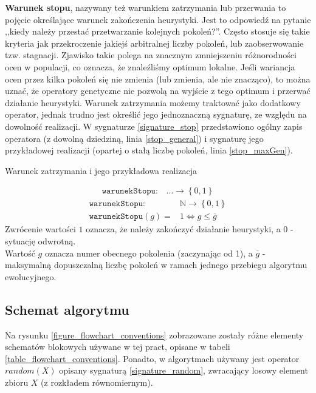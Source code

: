 \documentclass[twoside]{iisthesis}
\newcommand{\numberSet}{\mathbb}
\newcommand{\param}{\mathtt}
\begin{document}
\textbf{Warunek stopu}, nazywany też warunkiem zatrzymania lub przerwania to pojęcie określające warunek zakończenia heurystyki. Jest to odpowiedź na pytanie ,,kiedy należy przestać przetwarzanie kolejnych pokoleń?''. Często stosuje się takie kryteria jak przekroczenie jakiejś arbitralnej liczby pokoleń, lub zaobserwowanie tzw. stagnacji. Zjawisko takie polega na znacznym zmniejszeniu różnorodności ocen w populacji, co oznacza, że znaleźliśmy optimum lokalne. Jeśli wariancja ocen przez kilka pokoleń się nie zmienia (lub zmienia, ale nie znacząco), to można uznać, że operatory genetyczne nie pozwolą na wyjście z tego optimum i przerwać działanie heurystyki. 
Warunek zatrzymania możemy traktować jako dodatkowy operator, jednak trudno jest określić jego jednoznaczną sygnaturę, ze względu na dowolność realizacji. W sygnaturze \ref{signature_stop} przedstawiono ogólny zapis operatora (z dowolną dziedziną, linia \ref{stop_general}) i sygnaturę jego przykładowej realizacji (opartej o stałą liczbę pokoleń, linia \ref{stop_maxGen}).

\begin{signature}
	\caption{Warunek zatrzymania i jego przykładowa realizacja \label{signature_stop}} 
	\begin{align}
		\label{stop_general}
		\param{warunekStopu}: &\ldots \rightarrow \left\{ 0, 1 \right\}
	\end{align}
	\begin{align}
		\label{stop_maxGen}
		\param{warunekStopu}: &\numberSet{N} \rightarrow \left\{ 0, 1 \right\} \\
		\param{warunekStopu}(g) = &1 \Leftrightarrow g \leq \overline{g}
	\end{align}
	Zwrócenie wartości $1$ oznacza, że należy zakończyć działanie heurystyki, a $0$ - sytuację odwrotną. \\ 
	Wartość $g$ oznacza numer obecnego pokolenia (zaczynając od 1), a $\overline{g}$ - maksymalną dopuszczalną liczbę pokoleń w ramach jednego przebiegu algorytmu ewolucyjnego.
\end{signature}	

\subsection{Schemat algorytmu} \label{subsection_general_ea_scheme}

Na rysunku \ref{figure_flowchart_conventions} zobrazowane zostały różne elementy schematów blokowych używane w tej pract, opisane w tabeli \ref{table_flowchart_conventions}. Ponadto, w algorytmach używany jest operator $random(X)$ opisany sygnaturą \ref{signature_random}, zwracający losowy element zbioru $X$ (z rozkładem równomiernym).
\end{document}
